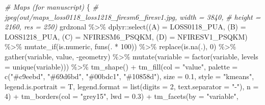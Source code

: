 \documentclass[10pt,landscape,a3paper]{article}
\newenvironment{Shaded}{\begin{snugshade}}{\end{snugshade}}
\newcommand{\AttributeTok}[1]{\textcolor[rgb]{0.77,0.63,0.00}{#1}}
\newcommand{\CommentTok}[1]{\textcolor[rgb]{0.56,0.35,0.01}{\textit{#1}}}
\newcommand{\DecValTok}[1]{\textcolor[rgb]{0.00,0.00,0.81}{#1}}
\newcommand{\FloatTok}[1]{\textcolor[rgb]{0.00,0.00,0.81}{#1}}
\newcommand{\FunctionTok}[1]{\textcolor[rgb]{0.00,0.00,0.00}{#1}}
\newcommand{\NormalTok}[1]{#1}
\newcommand{\OtherTok}[1]{\textcolor[rgb]{0.56,0.35,0.01}{#1}}
\newcommand{\SpecialCharTok}[1]{\textcolor[rgb]{0.00,0.00,0.00}{#1}}
\newcommand{\StringTok}[1]{\textcolor[rgb]{0.31,0.60,0.02}{#1}}
\begin{document}
\begin{Shaded}
\begin{Highlighting}[]
\CommentTok{\# Maps (for manuscript)}
\NormalTok{\{}
    \CommentTok{\# jpeg(\textquotesingle{}out/maps\_loss0118\_loss1218\_firesm6\_firesv1.jpg\textquotesingle{}, width = 3840,}
    \CommentTok{\# height = 2160, res = 250)}
\NormalTok{    grdzonal }\SpecialCharTok{\%\textgreater{}\%}
\NormalTok{        dplyr}\SpecialCharTok{::}\FunctionTok{select}\NormalTok{(}\StringTok{\textasciigrave{}}\AttributeTok{(A)}\StringTok{\textasciigrave{}} \OtherTok{=}\NormalTok{ LOSS0118\_PUA, }\StringTok{\textasciigrave{}}\AttributeTok{(B)}\StringTok{\textasciigrave{}} \OtherTok{=}\NormalTok{ LOSS1218\_PUA, }\StringTok{\textasciigrave{}}\AttributeTok{(C)}\StringTok{\textasciigrave{}} \OtherTok{=}\NormalTok{ NFIRESM6\_PSQKM,}
            \StringTok{\textasciigrave{}}\AttributeTok{(D)}\StringTok{\textasciigrave{}} \OtherTok{=}\NormalTok{ NFIRESV1\_PSQKM) }\SpecialCharTok{\%\textgreater{}\%}
        \FunctionTok{mutate\_if}\NormalTok{(is.numeric, }\FunctionTok{funs}\NormalTok{(. }\SpecialCharTok{*} \DecValTok{100}\NormalTok{)) }\SpecialCharTok{\%\textgreater{}\%}
        \FunctionTok{replace}\NormalTok{(}\FunctionTok{is.na}\NormalTok{(.), }\DecValTok{0}\NormalTok{) }\SpecialCharTok{\%\textgreater{}\%}
        \FunctionTok{gather}\NormalTok{(variable, value, }\SpecialCharTok{{-}}\NormalTok{geometry) }\SpecialCharTok{\%\textgreater{}\%}
        \FunctionTok{mutate}\NormalTok{(}\AttributeTok{variable =} \FunctionTok{factor}\NormalTok{(variable, }\AttributeTok{levels =} \FunctionTok{unique}\NormalTok{(variable))) }\SpecialCharTok{\%\textgreater{}\%}
        \FunctionTok{tm\_shape}\NormalTok{() }\SpecialCharTok{+} \FunctionTok{tm\_fill}\NormalTok{(}\AttributeTok{col =} \StringTok{"value"}\NormalTok{, }\AttributeTok{palette =} \FunctionTok{c}\NormalTok{(}\StringTok{"\#c9eebd"}\NormalTok{, }\StringTok{"\#69d6bd"}\NormalTok{, }\StringTok{"\#00bdc1"}\NormalTok{,}
        \StringTok{"\#10858d"}\NormalTok{), }\AttributeTok{size =} \FloatTok{0.1}\NormalTok{, }\AttributeTok{style =} \StringTok{"kmeans"}\NormalTok{, }\AttributeTok{legend.is.portrait =}\NormalTok{ T, }\AttributeTok{legend.format =} \FunctionTok{list}\NormalTok{(}\AttributeTok{digits =} \DecValTok{2}\NormalTok{,}
        \AttributeTok{text.separator =} \StringTok{"{-}"}\NormalTok{), }\AttributeTok{n =} \DecValTok{4}\NormalTok{) }\SpecialCharTok{+} \FunctionTok{tm\_borders}\NormalTok{(}\AttributeTok{col =} \StringTok{"grey15"}\NormalTok{, }\AttributeTok{lwd =} \FloatTok{0.3}\NormalTok{) }\SpecialCharTok{+} \FunctionTok{tm\_facets}\NormalTok{(}\AttributeTok{by =} \StringTok{"variable"}\NormalTok{,}

\end{Highlighting}
\end{Shaded}
\end{document}
